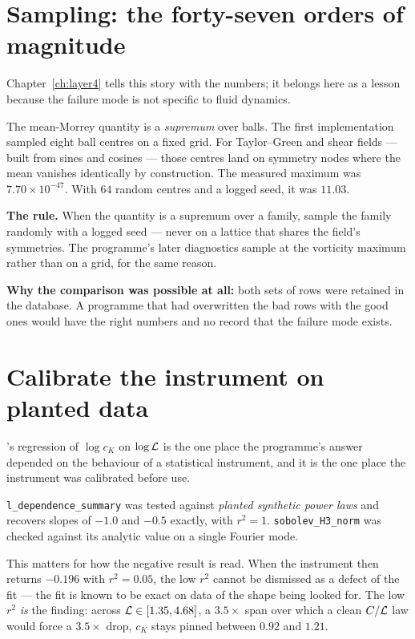 \section{Sampling: the forty-seven orders of magnitude}
\label{sec:sampling}

Chapter~\ref{ch:layer4} tells this story with the numbers; it belongs here as
a lesson because the failure mode is not specific to fluid dynamics.

The mean-Morrey quantity is a \emph{supremum} over balls. The first
implementation sampled eight ball centres on a fixed grid. For Taylor--Green
and shear fields --- built from sines and cosines --- those centres land on
symmetry nodes where the mean vanishes identically by construction. The
measured maximum was \(7.70\times10^{-47}\). With \(64\) random centres and a
logged seed, it was \(11.03\).

\begin{record}
\textbf{The rule.} When the quantity is a supremum over a family, sample the
family randomly with a logged seed --- never on a lattice that shares the
field's symmetries. The programme's later diagnostics sample at the vorticity
maximum rather than on a grid, for the same reason.

\smallskip
\textbf{Why the comparison was possible at all:} both sets of rows were
retained in the database. A programme that had overwritten the bad rows with
the good ones would have the right numbers and no record that the failure
mode exists.
\end{record}

\section{Calibrate the instrument on planted data}
\label{sec:calibration}

's regression of \(\log c_K\) on \(\log\mathcal{L}\) is the one place the
programme's answer depended on the behaviour of a statistical instrument, and
it is the one place the instrument was calibrated before use.

\texttt{l\_dependence\_summary} was tested against \emph{planted synthetic
power laws} and recovers slopes of \(-1.0\) and \(-0.5\) exactly, with
\(r^2=1\). \texttt{sobolev\_H3\_norm} was checked against its analytic value
on a single Fourier mode.

This matters for how the negative result is read. When the instrument then
returns \(-0.196\) with \(r^2=0.05\), the low \(r^2\) cannot be dismissed as a
defect of the fit --- the fit is known to be exact on data of the shape being
looked for. The low \(r^2\) \emph{is} the finding: across
\(\mathcal{L}\in[1.35,4.68]\), a \(3.5\times\) span over which a clean \(C/\mathcal{L}\)
law would force a \(3.5\times\) drop, \(c_K\) stays pinned between \(0.92\) and
\(1.21\).

